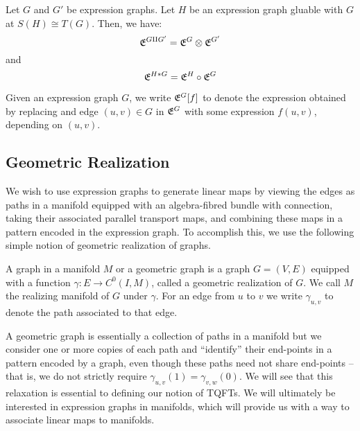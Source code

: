 \documentclass[./Thick_TQFTs_and_Quantum_Information.tex]{subfiles}
\begin{document}
\begin{thm}
Let $G$ and $G'$ be expression graphs. Let $H$ be an expression graph gluable
with $G$ at $S(H) \cong T(G)$. Then, we have:
\[
  \mathfrak{E}^{G \amalg G'} = \mathfrak{E}^{G} \otimes \mathfrak{E}^{G'}
\]
and
\[
  \mathfrak{E}^{H * G} = \mathfrak{E}^{H} \circ \mathfrak{E}^{G}
\]
\end{thm}

\begin{defn}
Given an expression graph $G$, we write $\mathfrak{E}^{G}[f]$ to denote the expression
obtained by replacing and edge $(u, v) \in G$ in $\mathfrak{E}^{G}$ with some expression
$f(u, v)$, depending on $(u, v)$.
\end{defn}

\subsection{Geometric Realization}

We wish to use expression graphs to generate linear maps by viewing the edges as
paths in a manifold equipped with an algebra-fibred bundle with connection,
taking their associated parallel transport maps, and combining these maps in a
pattern encoded in the expression graph. To accomplish this, we use the
following simple notion of geometric realization of graphs.

\begin{defn}
A graph in a manifold $M$ or a geometric graph is a graph $G = (V, E)$ equipped
with a function $\gamma : E \to C^0(I, M)$, called a geometric realization of
$G$. We call $M$ the realizing manifold of $G$ under $\gamma$. For an edge from
$u$ to $v$ we write $\gamma_{u, v}$ to denote the path associated to that edge.
\end{defn}

\begin{rmk}
A geometric graph is essentially a collection of paths in a manifold but we
consider one or more copies of each path and ``identify'' their end-points in a
pattern encoded by a graph, even though these paths need not share end-points --
that is, we do not strictly require $\gamma_{u, v}(1) = \gamma_{v, w}(0)$. We
will see that this relaxation is essential to defining our notion of TQFTs. We
will ultimately be interested in expression graphs in manifolds, which will
provide us with a way to associate linear maps to manifolds.
\end{rmk}
\end{document}
